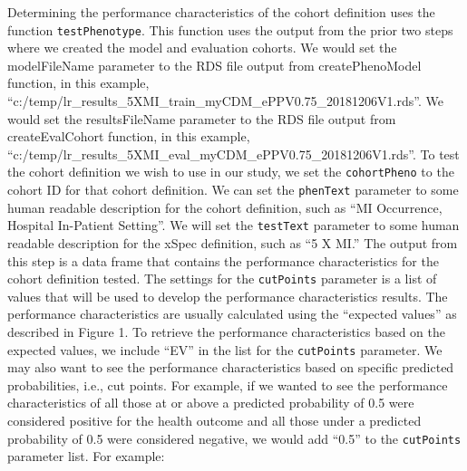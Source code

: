 \documentclass[11pt]{book}
\theoremstyle{definition}
\theoremstyle{definition}
\theoremstyle{definition}
\theoremstyle{remark}
\begin{document}
Determining the performance characteristics of the cohort definition
uses the function \texttt{testPhenotype}. This function uses the output
from the prior two steps where we created the model and evaluation
cohorts. We would set the modelFileName parameter to the RDS file output
from createPhenoModel function, in this example,
``c:/temp/lr\_results\_5XMI\_train\_myCDM\_ePPV0.75\_20181206V1.rds''.
We would set the resultsFileName parameter to the RDS file output from
createEvalCohort function, in this example,
``c:/temp/lr\_results\_5XMI\_eval\_myCDM\_ePPV0.75\_20181206V1.rds''. To
test the cohort definition we wish to use in our study, we set the
\texttt{cohortPheno} to the cohort ID for that cohort definition. We can
set the \texttt{phenText} parameter to some human readable description
for the cohort definition, such as ``MI Occurrence, Hospital In-Patient
Setting''. We will set the \texttt{testText} parameter to some human
readable description for the xSpec definition, such as ``5 X MI.'' The
output from this step is a data frame that contains the performance
characteristics for the cohort definition tested. The settings for the
\texttt{cutPoints} parameter is a list of values that will be used to
develop the performance characteristics results. The performance
characteristics are usually calculated using the ``expected values'' as
described in Figure 1. To retrieve the performance characteristics based
on the expected values, we include ``EV'' in the list for the
\texttt{cutPoints} parameter. We may also want to see the performance
characteristics based on specific predicted probabilities, i.e., cut
points. For example, if we wanted to see the performance characteristics
of all those at or above a predicted probability of 0.5 were considered
positive for the health outcome and all those under a predicted
probability of 0.5 were considered negative, we would add ``0.5'' to the
\texttt{cutPoints} parameter list. For example:
\end{document}
